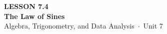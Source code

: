 \documentclass[aspectratio=169, 11pt]{beamer}
\begin{document}
{
\begin{frame}[plain]
  \vspace{2.8cm}\hspace{0.55cm}%
  \begin{minipage}{0.9\textwidth}
    {\color{goldacc}\bfseries\small LESSON 7.4}\\[0.5cm]
    {\color{white}\bfseries\LARGE The Law of Sines}\\[1.2cm]
    {\color{mistmid}\small Algebra, Trigonometry, and Data Analysis~$\cdot$~Unit 7}
  \end{minipage}
\end{frame}
}

\begin{frame}[t, plain]
\end{frame}
\end{document}
